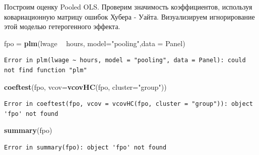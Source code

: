 \documentclass[]{book}
\newenvironment{Shaded}{\begin{snugshade}}{\end{snugshade}}
\newcommand{\DataTypeTok}[1]{\textcolor[rgb]{0.13,0.29,0.53}{#1}}
\newcommand{\KeywordTok}[1]{\textcolor[rgb]{0.13,0.29,0.53}{\textbf{#1}}}
\newcommand{\NormalTok}[1]{#1}
\newcommand{\OperatorTok}[1]{\textcolor[rgb]{0.81,0.36,0.00}{\textbf{#1}}}
\newcommand{\StringTok}[1]{\textcolor[rgb]{0.31,0.60,0.02}{#1}}
\begin{document}
Построим оценку Pooled OLS. Проверим значимость коэффициентов, используя ковариационную матрицу ошибок Хубера - Уайта. Визуализируем игнорирование этой моделью гетерогенного эффекта.

\begin{Shaded}
\begin{Highlighting}[]
\NormalTok{fpo =}\StringTok{ }\KeywordTok{plm}\NormalTok{(lwage }\OperatorTok{~}\StringTok{ }\NormalTok{hours, }\DataTypeTok{model=}\StringTok{"pooling"}\NormalTok{,}\DataTypeTok{data =}\NormalTok{ Panel)}
\end{Highlighting}
\end{Shaded}

\begin{verbatim}
Error in plm(lwage ~ hours, model = "pooling", data = Panel): could not find function "plm"
\end{verbatim}

\begin{Shaded}
\begin{Highlighting}[]
\KeywordTok{coeftest}\NormalTok{(fpo, }\DataTypeTok{vcov=}\KeywordTok{vcovHC}\NormalTok{(fpo, }\DataTypeTok{cluster=}\StringTok{"group"}\NormalTok{))}
\end{Highlighting}
\end{Shaded}

\begin{verbatim}
Error in coeftest(fpo, vcov = vcovHC(fpo, cluster = "group")): object 'fpo' not found
\end{verbatim}

\begin{Shaded}
\begin{Highlighting}[]
\KeywordTok{summary}\NormalTok{(fpo)}
\end{Highlighting}
\end{Shaded}

\begin{verbatim}
Error in summary(fpo): object 'fpo' not found
\end{verbatim}
\end{document}
